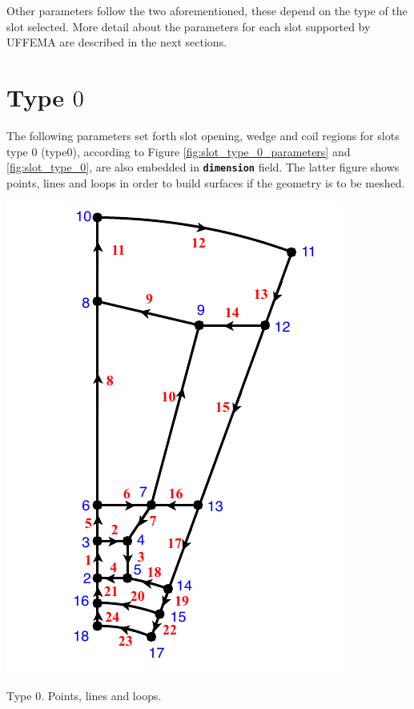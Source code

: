 \documentclass[justified]{tufte-book} %
\begin{document}
Other parameters follow the two aforementioned, these depend on the type of the slot selected. More detail about the parameters for each slot supported by UFFEMA are described in the next sections.

\section[Type 0]{Type $0$}
The following parameters set forth slot opening, wedge and coil regions for slots type $0$ (type$0$), according to Figure \ref{fig:slot_type_0_parameters} and \ref{fig:slot_type_0}, are also embedded in \texttt{\textbf{dimension}} field.  The latter figure shows points, lines and loops in order to build surfaces if the geometry is to be meshed. 



\begin{marginfigure}
\includegraphics[width=\linewidth]{Slot_Type_0.pdf}
\caption{Type $0$. Points, lines and loops.}
\label{fig:slot_type_0}
\end{marginfigure}
\end{document}
